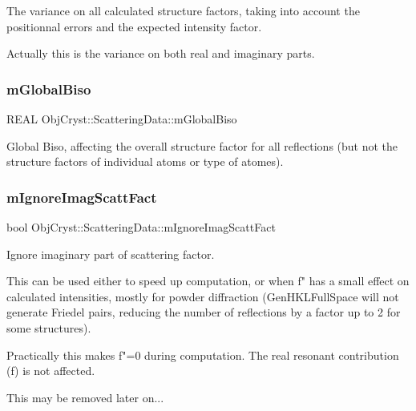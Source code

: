 The variance on all calculated structure factors, taking into account the positionnal errors and the expected intensity factor.

Actually this is the variance on both real and imaginary parts. \mbox{\label{class_obj_cryst_1_1_scattering_data_a15f71120c0eabe7b1bd768663a176752}} 
\subsubsection{\texorpdfstring{mGlobalBiso}{mGlobalBiso}}
{\footnotesize\ttfamily R\+E\+AL Obj\+Cryst\+::\+Scattering\+Data\+::m\+Global\+Biso\hspace{0.3cm}{\ttfamily [protected]}}

Global Biso, affecting the overall structure factor for all reflections (but not the structure factors of individual atoms or type of atomes). \mbox{\label{class_obj_cryst_1_1_scattering_data_a3a9764c52916a533a44baaea89bdceab}} 
\subsubsection{\texorpdfstring{mIgnoreImagScattFact}{mIgnoreImagScattFact}}
{\footnotesize\ttfamily bool Obj\+Cryst\+::\+Scattering\+Data\+::m\+Ignore\+Imag\+Scatt\+Fact\hspace{0.3cm}{\ttfamily [protected]}}



Ignore imaginary part of scattering factor. 

This can be used either to speed up computation, or when f" has a small effect on calculated intensities, mostly for powder diffraction (Gen\+H\+K\+L\+Full\+Space will not generate Friedel pairs, reducing the number of reflections by a factor up to 2 for some structures).

Practically this makes f"=0 during computation. The real resonant contribution (f\textquotesingle{}) is not affected.

This may be removed later on... \mbox{\label{class_obj_cryst_1_1_scattering_data_acb0398e21f803308b79103182906f6c5}} 
